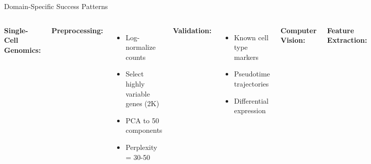 \documentclass[aspectratio=169]{beamer}
\begin{document}
\begin{frame}{Domain-Specific Success Patterns}
\begin{columns}
\textbf{Single-Cell Genomics:}

\textbf{Preprocessing:}
\begin{itemize}
\item Log-normalize counts
\item Select highly variable genes (2K)
\item PCA to 50 components
\item Perplexity = 30-50
\end{itemize}

\textbf{Validation:}
\begin{itemize}
\item Known cell type markers
\item Pseudotime trajectories
\item Differential expression
\end{itemize}

\textbf{Computer Vision:}

\textbf{Feature Extraction:}
\begin{itemize}
\item CNN final layer (2048D)
\item No additional PCA needed
\item Cosine distance metric
\item Perplexity = 50
\end{itemize}

\textbf{Validation:}
\begin{itemize}
\item Class separation
\item Adversarial examples
\item Misclassification patterns
\end{itemize}

\textbf{Natural Language Processing:}

\textbf{Embeddings:}
\begin{itemize}
\item Word2Vec/BERT vectors
\item Normalize to unit length
\item Cosine distance
\item Perplexity = 20-40
\end{itemize}

\textbf{Validation:}
\begin{itemize}
\item Semantic clusters
\item Analogy preservation
\item Bias detection
\end{itemize}


\end{columns}
\end{frame}
\end{document}
